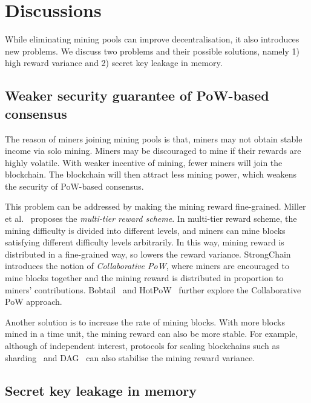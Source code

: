 \section{Discussions}
\label{sec:discussions}

While eliminating mining pools can improve decentralisation, it also introduces new problems.
We discuss two problems and their possible solutions, namely 1) high reward variance and 2) secret key leakage in memory.

\subsection{Weaker security guarantee of PoW-based consensus}

The reason of miners joining mining pools is that, miners may not obtain stable income via solo mining.
Miners may be discouraged to mine if their rewards are highly volatile.
With weaker incentive of mining, fewer miners will join the blockchain.
The blockchain will then attract less mining power, which weakens the security of PoW-based consensus.

This problem can be addressed by making the mining reward fine-grained.
Miller et al.~\cite{miller2015nonoutsourceable} proposes the \emph{multi-tier reward scheme}.
In multi-tier reward scheme, the mining difficulty is divided into different levels, and miners can mine blocks satisfying different difficulty levels arbitrarily.
In this way, mining reward is distributed in a fine-grained way, so lowers the reward variance.
StrongChain~\cite{szalachowski2019strongchain} introduces the notion of \emph{Collaborative PoW}, where miners are encouraged to mine blocks together and the mining reward is distributed in proportion to miners' contributions.
Bobtail~\cite{bissias2020bobtail} and HotPoW~\cite{keller2019hotpow} further explore the Collaborative PoW approach.

Another solution is to increase the rate of mining blocks.
With more blocks mined in a time unit, the mining reward can also be more stable.
For example, although of independent interest, protocols for scaling blockchains such as sharding~\cite{wang2019monoxide} and DAG~\cite{li2018scaling} can also stabilise the mining reward variance.



\subsection{Secret key leakage in memory}


